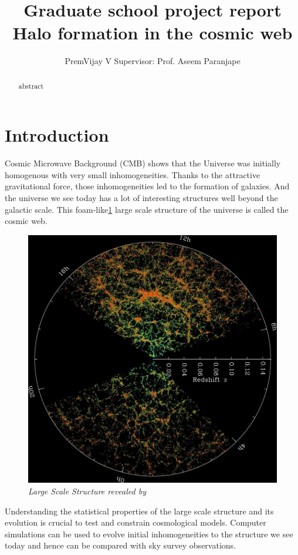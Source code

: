 \documentclass[12pt]{article}
\title{Graduate school project report\\
	Halo formation in the cosmic web}
\author{ PremVijay V \qquad Supervisor: Prof. Aseem Paranjape}
\begin{document}
\maketitle


\begin{abstract}
abstract
\end{abstract}

\section{Introduction}
Cosmic Microwave Background (CMB) shows that the Universe was initially homogenous with very small inhomogeneities. Thanks to the attractive gravitational force, those inhomogeneities led to the formation of galaxies. And the universe we see today has a lot of interesting structures well beyond the galactic scale. This foam-like\ref{fig:orangepie} large scale structure of the universe is called the cosmic web. 

\begin{figure}
\centering
\includegraphics[width=0.9\linewidth]{orangepie}
\caption{ \textit{Large Scale Structure revealed by \cite{cite_sdss}}}
\label{fig:orangepie}
\end{figure}

Understanding the statistical properties of the large scale structure and its evolution is crucial to test and constrain cosmological models. Computer simulations can be used to evolve initial inhomogeneities to the structure we see today and hence can be compared with sky survey observations.
\end{document}
